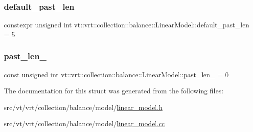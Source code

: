 \subsubsection{\texorpdfstring{default\+\_\+past\+\_\+len}{default\_past\_len}}
{\footnotesize\ttfamily constexpr unsigned int vt\+::vrt\+::collection\+::balance\+::\+Linear\+Model\+::default\+\_\+past\+\_\+len = 5\hspace{0.3cm}{\ttfamily [static]}}

\mbox{\label{structvt_1_1vrt_1_1collection_1_1balance_1_1_linear_model_ab8225e994dfda4bfc16371cbf58ef578}} 
\subsubsection{\texorpdfstring{past\+\_\+len\+\_\+}{past\_len\_}}
{\footnotesize\ttfamily const unsigned int vt\+::vrt\+::collection\+::balance\+::\+Linear\+Model\+::past\+\_\+len\+\_\+ = 0\hspace{0.3cm}{\ttfamily [private]}}



The documentation for this struct was generated from the following files\+:\begin{DoxyCompactItemize}
\item 
src/vt/vrt/collection/balance/model/\hyperlink{linear__model_8h}{linear\+\_\+model.\+h}\item 
src/vt/vrt/collection/balance/model/\hyperlink{linear__model_8cc}{linear\+\_\+model.\+cc}\end{DoxyCompactItemize}
